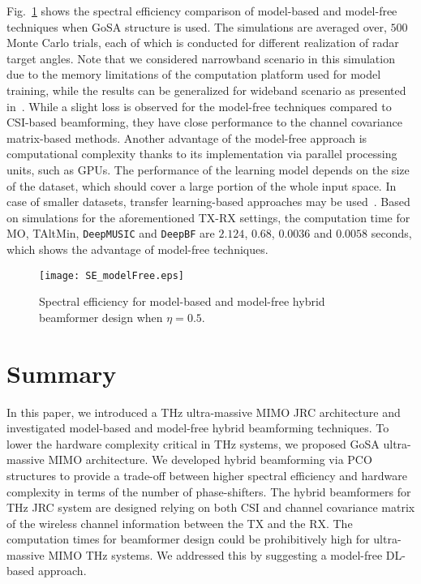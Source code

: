 \documentclass[journal,10pt]{IEEEtran}
\begin{document}
	Fig.~\ref{fig_SE_SNR_ModelFree} shows the spectral efficiency comparison of model-based and model-free techniques when GoSA structure is used. The simulations are averaged over,  $500$ Monte Carlo trials, each of which is conducted for different realization of radar target angles. {\color{black}Note that we considered narrowband scenario in this simulation due to the memory limitations of the computation platform used for model training, while the results can be generalized for wideband scenario as presented in~\cite{elbir2019online}.} While a slight loss is observed for the model-free techniques compared to CSI-based beamforming, they have close performance to the channel covariance matrix-based methods. Another advantage of the model-{\color{black}free} approach is computational complexity thanks to its implementation via parallel processing units, such as GPUs. {\color{black}The performance of the learning model depends on the size of the dataset, which should cover a large portion of the whole input space. In case of smaller datasets, transfer learning-based approaches may be used~\cite{elbir2020TL}.} Based on simulations for the aforementioned TX-RX settings, the computation time for MO, TAltMin, \texttt{DeepMUSIC} and \texttt{DeepBF} are $2.124$, $0.68$, $0.0036$ and $0.0058$ seconds, which shows the advantage of model-free techniques. 
	
	
	
	\begin{figure}[t]
		\centering
		{\texttt{[image: SE\_modelFree.eps]} } 
		\caption{Spectral efficiency for model-based and model-free hybrid beamformer design when $\eta = 0.5$. 
		}
		\label{fig_SE_SNR_ModelFree}
	\end{figure}
	
	
	
	
	
	
	\section{Summary}
	\label{sec:summ}
	In this paper, we introduced a THz ultra-massive MIMO JRC architecture and investigated model-based and model-free hybrid beamforming techniques. To lower the hardware complexity critical in THz systems, we proposed GoSA ultra-massive MIMO architecture. 	We developed hybrid beamforming via PCO structures to provide a trade-off between higher spectral efficiency and hardware complexity in terms of the number of phase-shifters. The hybrid beamformers for THz JRC system are designed relying on both CSI and channel covariance matrix of the wireless channel information between the TX and the RX. The computation times for beamformer design could be prohibitively high for ultra-massive MIMO THz systems. We addressed this by suggesting a model-free DL-based approach. 
	
\end{document}
